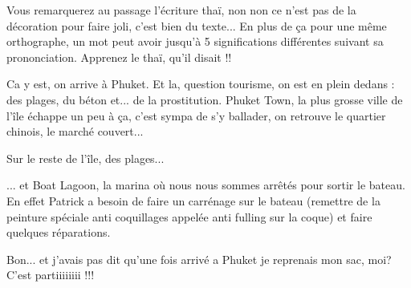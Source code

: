 \begin{multicols}{2}

Vous remarquerez au passage l'écriture thaï, non non ce n'est pas de la décoration pour faire joli, c'est bien du texte... En plus de ça pour une même orthographe, un mot peut avoir jusqu'à 5 significations différentes suivant sa prononciation. Apprenez le thaï, qu'il disait !!

Ca y est, on arrive à Phuket. Et la, question tourisme, on est en plein dedans : des plages, du béton et... de la prostitution. Phuket Town, la plus grosse ville de l'île échappe un peu à ça, c'est sympa de s'y ballader, on retrouve le quartier chinois, le marché couvert...


Sur le reste de l'île, des plages...


... et Boat Lagoon, la marina où nous nous sommes arrêtés pour sortir le bateau. En effet Patrick a besoin de faire un carrénage sur le bateau (remettre de la peinture spéciale anti coquillages appelée anti fulling sur la coque) et faire quelques réparations.




Bon... et j'avais pas dit qu'une fois arrivé a Phuket je reprenais mon sac, moi? C'est partiiiiiiii !!!


\end{multicols}
